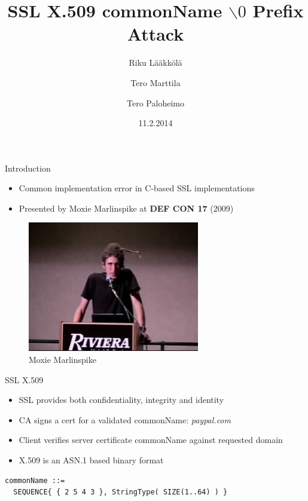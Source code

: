 \documentclass{beamer}
\title[SSL X.509 commonName Attack]{SSL X.509 commonName $\backslash0$ Prefix Attack}
\author{Riku Lääkkölä \and Tero Marttila \and Tero Paloheimo}
\institute{Aalto ELEC}
\date{11.2.2014}
\begin{document}
\begin{frame}
  	\titlepage
\end{frame}


\begin{frame}{Introduction}
	\begin{itemize}
    \item Common implementation error in C-based SSL implementations
    \item Presented by Moxie Marlinspike at \textbf{DEF CON 17} (2009)
 	\end{itemize}
  \begin{figure}
    \includegraphics[scale=.7]{moxie}
    \caption{Moxie Marlinspike}
  \end{figure}
\end{frame}

\begin{frame}[fragile]{SSL X.509}
  \begin{itemize}
    \item SSL provides both confidentiality, integrity and identity
    \item CA signs a cert for a validated commonName: \emph{paypal.com}
    \item Client verifies server certificate commonName against requested domain
    \item X.509 is an ASN.1 based binary format
  \end{itemize}
  \begin{verbatim}
commonName ::=
  SEQUENCE{ { 2 5 4 3 }, StringType( SIZE(1..64) ) }
  \end{verbatim}
\end{frame}
\end{document}
